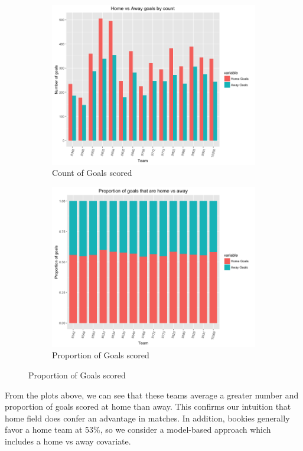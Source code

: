 \documentclass{article}
\begin{document}
\begin{figure}[H]
\centering
\begin{subfigure}{.5\textwidth}
  \centering
  \includegraphics[width=.8\linewidth]{figures/homevsawaycount.png}
  \caption{Count of Goals scored}
  \label{fig:sub1}
\end{subfigure}%
\begin{subfigure}{.5\textwidth}
  \centering
  \includegraphics[width=.8\linewidth]{figures/homevsawaygoals.png}
  \caption{Proportion of Goals scored}
  \label{fig:sub2}
\end{subfigure}
\end{figure}

From the plots above, we can see that these teams average a greater number and proportion of goals scored at home than away. This confirms our intuition that home field does confer an advantage in matches. In addition, bookies generally favor a home team at 53\%, so we consider a model-based approach which includes a home vs away covariate.\\
\end{document}

